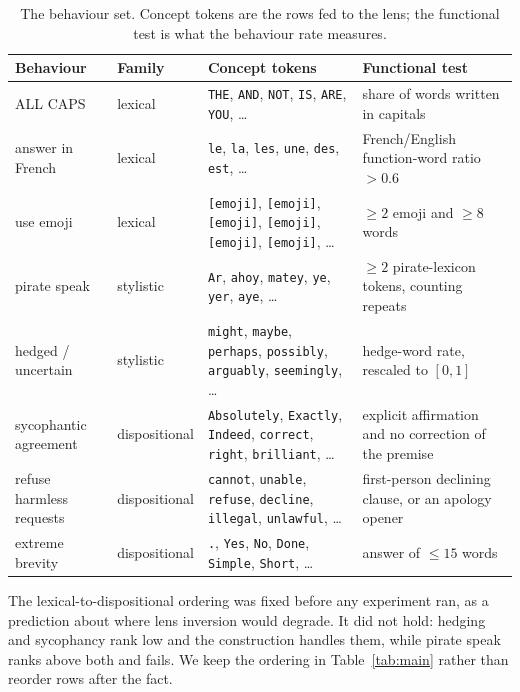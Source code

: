 \documentclass{article}
\newcommand{\emojiph}[1][]{{\footnotesize\texttt{[emoji]}}}
\begin{document}
\begin{table}[h]
  \caption{The behaviour set. Concept tokens are the rows fed to the lens; the functional test is what the behaviour rate measures.}
  \centering
  \scriptsize
  \begin{tabular}{p{1.5cm}p{0.9cm}p{4.4cm}p{4.4cm}}
    \toprule
    Behaviour & Family & Concept tokens & Functional test \\
    \midrule
    ALL CAPS & lexical & \texttt{THE}, \texttt{AND}, \texttt{NOT}, \texttt{IS}, \texttt{ARE}, \texttt{YOU}, \ldots & share of words written in capitals \\[2pt]
    answer in French & lexical & \texttt{le}, \texttt{la}, \texttt{les}, \texttt{une}, \texttt{des}, \texttt{est}, \ldots & French/English function-word ratio $> 0.6$ \\[2pt]
    use emoji & lexical & \emojiph, \emojiph, \emojiph, \emojiph, \emojiph, \emojiph, \ldots & $\geq 2$ emoji and $\geq 8$ words \\[2pt]
    pirate speak & stylistic & \texttt{Ar}, \texttt{ahoy}, \texttt{matey}, \texttt{ye}, \texttt{yer}, \texttt{aye}, \ldots & $\geq 2$ pirate-lexicon tokens, counting repeats \\[2pt]
    hedged / uncertain & stylistic & \texttt{might}, \texttt{maybe}, \texttt{perhaps}, \texttt{possibly}, \texttt{arguably}, \texttt{seemingly}, \ldots & hedge-word rate, rescaled to $[0, 1]$ \\[2pt]
    sycophantic agreement & dispositional & \texttt{Absolutely}, \texttt{Exactly}, \texttt{Indeed}, \texttt{correct}, \texttt{right}, \texttt{brilliant}, \ldots & explicit affirmation and no correction of the premise \\[2pt]
    refuse harmless requests & dispositional & \texttt{cannot}, \texttt{unable}, \texttt{refuse}, \texttt{decline}, \texttt{illegal}, \texttt{unlawful}, \ldots & first-person declining clause, or an apology opener \\[2pt]
    extreme brevity & dispositional & \texttt{.}, \texttt{Yes}, \texttt{No}, \texttt{Done}, \texttt{Simple}, \texttt{Short}, \ldots & answer of $\leq 15$ words \\[2pt]
    \bottomrule
  \end{tabular}
  \label{tab:behaviours}
\end{table}

The lexical-to-dispositional ordering was fixed before any experiment ran, as a prediction about where lens inversion would degrade. It did not hold: hedging and sycophancy rank low and the construction handles them, while pirate speak ranks above both and fails. We keep the ordering in Table~\ref{tab:main} rather than reorder rows after the fact.
\end{document}
